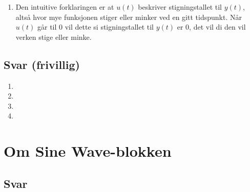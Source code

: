 \documentclass[answers,11pt]{exam}
\begin{document}
\begin{enumerate}[label=\alph*)]
\begin{tcolorbox}
\begin{enumerate}[label=d\arabic*)]
      \item
            Den intuitive forklaringen er at $u(t)$ beskriver stigningstallet
            til $y(t)$, altså hvor mye funksjonen stiger eller minker ved en
            gitt
            tidspunkt. Når $u(t)$ går til 0 vil dette si stigningstallet til
            $y(t)$ er 0,
            det vil di den vil verken stige eller minke.
    \end{enumerate}

  \end{tcolorbox}

  \newpage
  

  \begin{tcolorbox}
    \subsection*{Svar (frivillig)}

    \begin{enumerate}[label=e\arabic*)]
      \item
      \item

      \item

      \item

    \end{enumerate}

  \end{tcolorbox}

  \newpage
  \section*{Om {\sf  Sine Wave}-blokken}

  

  \begin{tcolorbox}
    \subsection*{Svar}


\end{tcolorbox}
\end{enumerate}
\end{document}
